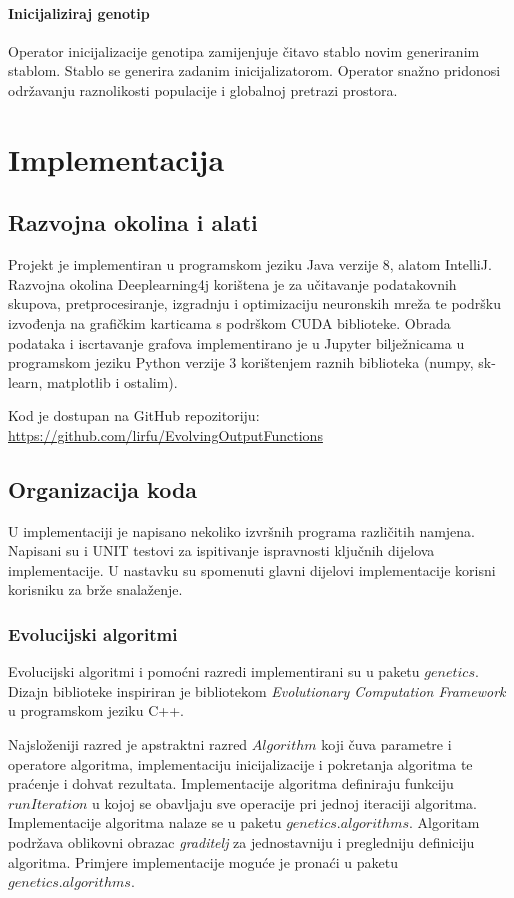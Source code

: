 \documentclass[times, utf8, numeric, diplomski]{fer}
\begin{document}
\subsubsection{Inicijaliziraj genotip}
Operator inicijalizacije genotipa zamijenjuje čitavo stablo novim generiranim stablom. Stablo se generira zadanim inicijalizatorom. Operator snažno pridonosi održavanju raznolikosti populacije i globalnoj pretrazi prostora.


\chapter{Implementacija}
\section{Razvojna okolina i alati}
Projekt je implementiran u programskom jeziku Java verzije 8, alatom IntelliJ. Razvojna okolina Deeplearning4j korištena je za učitavanje podatakovnih skupova, pretprocesiranje, izgradnju i optimizaciju neuronskih mreža te podršku izvođenja na grafičkim karticama s podrškom CUDA biblioteke. Obrada podataka i iscrtavanje grafova implementirano je u Jupyter bilježnicama u programskom jeziku Python verzije 3 korištenjem raznih biblioteka (numpy, sk-learn, matplotlib i ostalim).

\noindent
Kod je dostupan na GitHub repozitoriju: \\
\url{https://github.com/lirfu/EvolvingOutputFunctions}

\section{Organizacija koda}
U implementaciji je napisano nekoliko izvršnih programa različitih namjena. Napisani su i UNIT testovi za ispitivanje ispravnosti ključnih dijelova implementacije. U nastavku su spomenuti glavni dijelovi implementacije korisni korisniku za brže snalaženje.

\subsection{Evolucijski algoritmi}
Evolucijski algoritmi i pomoćni razredi implementirani su u paketu $genetics$. Dizajn biblioteke inspiriran je bibliotekom \textit{Evolutionary Computation Framework} \citep{ecf} u programskom jeziku C++. 

Najsloženiji razred je apstraktni razred $Algorithm$ koji čuva parametre i operatore algoritma, implementaciju inicijalizacije i pokretanja algoritma te praćenje i dohvat rezultata. Implementacije algoritma definiraju funkciju $runIteration$ u kojoj se obavljaju sve operacije pri jednoj iteraciji algoritma. Implementacije algoritma nalaze se u paketu $genetics.algorithms$. Algoritam podržava oblikovni obrazac \textit{graditelj} za jednostavniju i pregledniju definiciju algoritma. Primjere implementacije moguće je pronaći u paketu $genetics.algorithms$.
\end{document}
